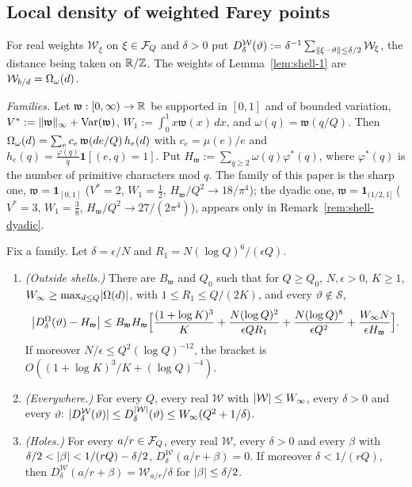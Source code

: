 \subsection{Local density of weighted Farey points}\label{ssec:shell-density-farey}
For real weights $\mathcal W_\xi$ on $\xi\in\mathcal F_Q$ and $\delta>0$ put $D^{\mathcal W}_\delta(\vartheta):=\delta^{-1}\sum_{\lVert \xi-\vartheta\rVert\le\delta/2}\mathcal W_\xi$,
the distance being taken on $\mathbb R/\mathbb Z$. The weights of Lemma~\ref{lem:shell-1} are $\mathcal W_{b/d}=\Omega_\omega(d)$.

\emph{Families.} Let $\mathfrak w:[0,\infty)\to\mathbb R$ be supported in $[0,1]$ and of bounded variation, $V^*:=\lVert \mathfrak w\rVert_\infty+\operatorname{Var}(\mathfrak w)$,
$W_1:=\int_0^1x\mathfrak w(x)\,dx$, and $\omega(q)=\mathfrak w(q/Q)$. Then $\Omega_\omega(d)=\sum_ec_e\,\mathfrak w(de/Q)\,h_e(d)$ with $c_e=\mu(e)/e$ and
$h_e(q)=\frac{\varphi(q)}q\mathbf 1[(e,q)=1]$. Put $H_{\mathfrak w}:=\sum_{q\ge2}\omega(q)\varphi^*(q)$, where $\varphi^*(q)$ is the number of primitive characters mod $q$.
The family of this paper is the sharp one, $\mathfrak w=\mathbf 1_{[0,1]}$ ($V^*=2$, $W_1=\frac12$, $H_{\mathfrak w}/Q^2\to18/\pi^4$); the dyadic one,
$\mathfrak w=\mathbf 1_{(1/2,1]}$ ($V^*=3$, $W_1=\frac38$, $H_{\mathfrak w}/Q^2\to27/(2\pi^4)$), appears only in Remark~\ref{rem:shell-dyadic}.

\begin{lemma}\label{lem:shell-2}
Fix a family. Let $\delta=\epsilon/N$ and $R_1=N(\log Q)^6/(\epsilon Q)$.
\begin{enumerate}[label=(\alph*)]
\item \emph{(Outside shells.)} There are $B_{\mathfrak w}$ and $Q_0$ such that for $Q\ge Q_0$, $N,\epsilon>0$, $K\ge1$, $W_\infty\ge\max_{d\le Q}\lvert \Omega(d)\rvert$, with
$1\le R_1\le Q/(2K)$, and every $\vartheta\notin\mathcal S$,
\[
\bigl|D^{\Omega}_\delta(\vartheta)-H_{\mathfrak w}\bigr|\le B_{\mathfrak w}H_{\mathfrak w}\Bigl[\frac{(1+\log K)^3}K+\frac{N(\log Q)^2}{\epsilon QR_1}+\frac{N(\log Q)^8}{\epsilon Q^2}+\frac{W_\infty N}{\epsilon H_{\mathfrak w}}\Bigr].
\]
If moreover $N/\epsilon\le Q^2(\log Q)^{-12}$, the bracket is $O((1+\log K)^3/K+(\log Q)^{-4})$.
\item \emph{(Everywhere.)} For every $Q$, every real $\mathcal W$ with $\lvert \mathcal W\rvert\le W_\infty$, every $\delta>0$ and every $\vartheta$:
$\lvert D^{\mathcal W}_\delta(\vartheta)\rvert\le D^{\lvert \mathcal W\rvert}_\delta(\vartheta)\le W_\infty(Q^2+1/\delta)$.
\item \emph{(Holes.)} For every $a/r\in\mathcal F_Q$, every real $\mathcal W$, every $\delta>0$ and every $\beta$ with $\delta/2<\lvert \beta\rvert<1/(rQ)-\delta/2$,
$D^{\mathcal W}_\delta(a/r+\beta)=0$. If moreover $\delta<1/(rQ)$, then $D^{\mathcal W}_\delta(a/r+\beta)=\mathcal W_{a/r}/\delta$ for $\lvert \beta\rvert\le\delta/2$.
\end{enumerate}
\end{lemma}

